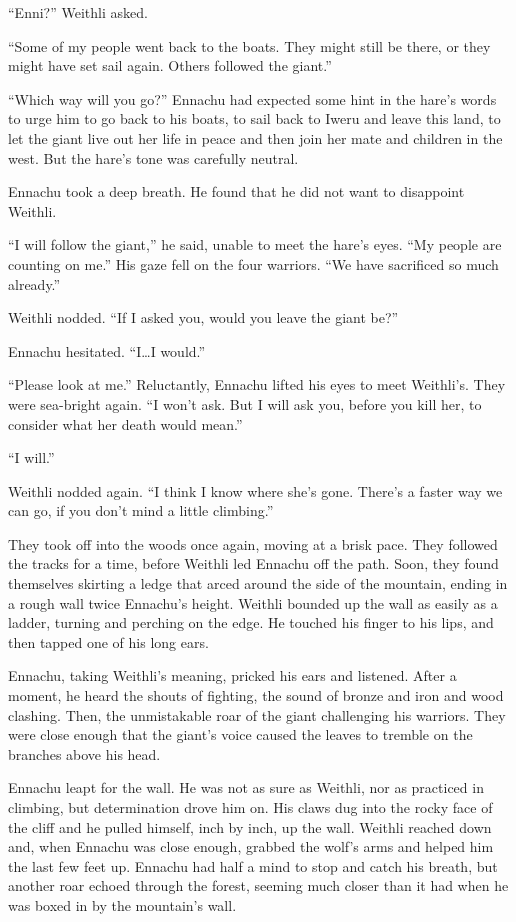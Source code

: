 ``Enni?'' Weithli asked.

``Some of my people went back to the boats. They might still be there, or they might have set sail again. Others followed the giant.''

``Which way will you go?'' Ennachu had expected some hint in the hare's words to urge him to go back to his boats, to sail back to Iweru and leave this land, to let the giant live out her life in peace and then join her mate and children in the west. But the hare's tone was carefully neutral.

Ennachu took a deep breath. He found that he did not want to disappoint Weithli.

``I will follow the giant,'' he said, unable to meet the hare's eyes. ``My people are counting on me.'' His gaze fell on the four warriors. ``We have sacrificed so much already.''

Weithli nodded. ``If I asked you, would you leave the giant be?''

Ennachu hesitated. ``I\ldots{}I would.''

``Please look at me.'' Reluctantly, Ennachu lifted his eyes to meet Weithli's. They were sea-bright again. ``I won't ask. But I will ask you, before you kill her, to consider what her death would mean.''

``I will.''

Weithli nodded again. ``I think I know where she's gone. There's a faster way we can go, if you don't mind a little climbing.''

They took off into the woods once again, moving at a brisk pace. They followed the tracks for a time, before Weithli led Ennachu off the path. Soon, they found themselves skirting a ledge that arced around the side of the mountain, ending in a rough wall twice Ennachu's height. Weithli bounded up the wall as easily as a ladder, turning and perching on the edge. He touched his finger to his lips, and then tapped one of his long ears.

Ennachu, taking Weithli's meaning, pricked his ears and listened. After a moment, he heard the shouts of fighting, the sound of bronze and iron and wood clashing. Then, the unmistakable roar of the giant challenging his warriors. They were close enough that the giant's voice caused the leaves to tremble on the branches above his head.

Ennachu leapt for the wall. He was not as sure as Weithli, nor as practiced in climbing, but determination drove him on. His claws dug into the rocky face of the cliff and he pulled himself, inch by inch, up the wall. Weithli reached down and, when Ennachu was close enough, grabbed the wolf's arms and helped him the last few feet up. Ennachu had half a mind to stop and catch his breath, but another roar echoed through the forest, seeming much closer than it had when he was boxed in by the mountain's wall.

